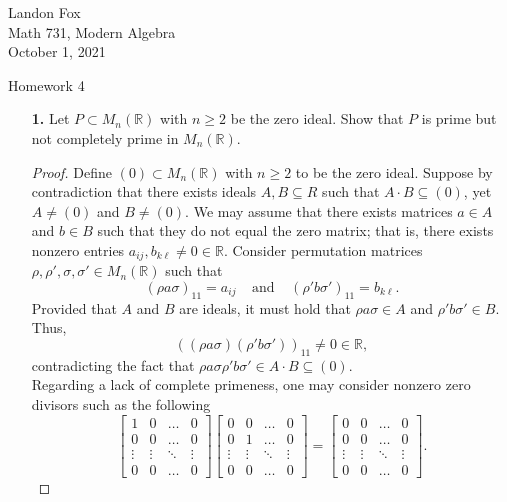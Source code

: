 \documentclass[ 12pt ]{article}
\begin{document}
\noindent Landon Fox \\
\noindent Math 731, Modern Algebra \\
\noindent October 1, 2021

\begin{center}
\Large Homework 4
\end{center}

\begin{enumerate}
	\item[\textbf{1.}] Let $P \subset M_n(\mathbb{R})$ with $n \geq 2$ be the zero ideal. Show that $P$ is prime but not completely prime in $M_n(\mathbb{R})$.

		\begin{proof}
			Define $(0) \subset M_n(\mathbb{R})$ with $n \geq 2$ to be the zero ideal. Suppose by contradiction that there exists ideals $A, B \subseteq R$ such that $A \cdot B \subseteq (0)$, yet $A \neq (0)$ and $B \neq (0)$. We may assume that there exists matrices $a \in A$ and $b \in B$ such that they do not equal the zero matrix; that is, there exists nonzero entries $a_{ij}, b_{k\ell} \neq 0 \in \mathbb{R}$. Consider permutation matrices $\rho, \rho', \sigma, \sigma' \in M_n(\mathbb{R})$ such that $$(\rho a \sigma)_{11} = a_{ij}\;\;\;\; \mathrm{and}\;\;\;\; (\rho' b \sigma')_{11} = b_{k\ell}.$$ Provided that $A$ and $B$ are ideals, it must hold that $\rho a \sigma \in A$ and $\rho' b \sigma' \in B$. Thus, $$((\rho a \sigma)(\rho' b \sigma'))_{11} \neq 0 \in \mathbb{R},$$ contradicting the fact that $\rho a \sigma \rho' b \sigma' \in A \cdot B \subseteq (0)$. \\

			Regarding a lack of complete primeness, one may consider nonzero zero divisors such as the following $$\begin{bmatrix} 1 & 0 & \hdots & 0 \\ 0 & 0 & \hdots & 0 \\ \vdots & \vdots & \ddots & \vdots \\ 0 & 0 & \hdots & 0 \end{bmatrix} \begin{bmatrix} 0 & 0 & \hdots & 0 \\ 0 & 1 & \hdots & 0 \\ \vdots & \vdots & \ddots & \vdots \\ 0 & 0 & \hdots & 0 \end{bmatrix} = \begin{bmatrix} 0 & 0 & \hdots & 0 \\ 0 & 0 & \hdots & 0 \\ \vdots & \vdots & \ddots & \vdots \\ 0 & 0 & \hdots & 0 \end{bmatrix}.$$
		\end{proof}



\end{enumerate}
\end{document}
